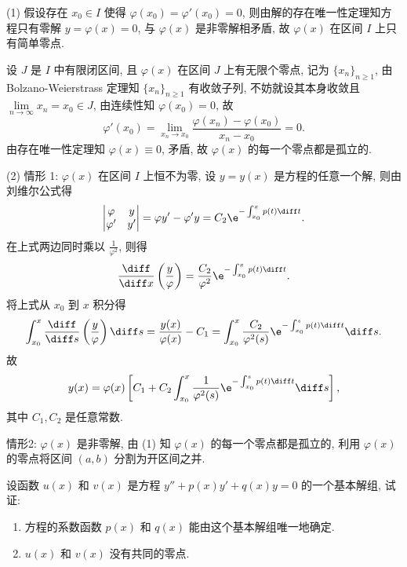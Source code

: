 \begin{solve}
  (1) 假设存在 $x_0\in I$ 使得 $\varphi(x_0)=\varphi'(x_0)=0$, 
  则由解的存在唯一性定理知方程只有零解 $y=\varphi(x)=0$, 与 $\varphi(x)$ 是非零解相矛盾, 
  故 $\varphi(x)$ 在区间 $I$ 上只有简单零点.

  设 $J$ 是 $I$ 中有限闭区间, 且 $\varphi(x)$ 在区间 $J$ 上有无限个零点, 记为 $\{x_n\}_{n\geq 1}$, 
  由 Bolzano-Weierstrass 定理知 $\{x_n\}_{n\geq 1}$ 有收敛子列,
  不妨就设其本身收敛且 $\lim\limits_{n\to\infty}x_n=x_0\in J$, 由连续性知 $\varphi(x_0)=0$, 故
  \[\varphi'(x_0)=\lim_{x_n\to x_0}\frac{\varphi(x_n)-\varphi(x_0)}{x_n-x_0}=0.\]
  由存在唯一性定理知 $\varphi(x)\equiv 0$, 矛盾, 故 $\varphi(x)$ 的每一个零点都是孤立的.

  (2) 情形 1: $\varphi(x)$ 在区间 $I$ 上恒不为零, 设 $y=y(x)$ 是方程的任意一个解, 则由刘维尔公式得
  \[\begin{vmatrix}\varphi&y\\\varphi'&y'\end{vmatrix}
    = \varphi y'-\varphi'y=C_2\e^{-\int_{x_0}^xp(t)\diff t}.\]
  在上式两边同时乘以 $\frac{1}{\varphi^2}$, 则得
  \[\frac{\diff}{\diff x}\left(\frac{y}{\varphi}\right)
    = \frac{C_2}{\varphi^2}\e^{-\int_{x_0}^xp(t)\diff t}.\]
  将上式从 $x_0$ 到 $x$ 积分得
  \[\int_{x_0}^x\frac{\diff}{\diff s}\left(\frac{y}{\varphi}\right)\diff s
    = \frac{y(x)}{\varphi(x)}-C_1
    = \int_{x_0}^x\frac{C_2}{\varphi^2(s)}\e^{-\int_{x_0}^sp(t)\diff t}\diff s.\]
  故
  \[y(x) = \varphi(x)\left[C_1+C_2\int_{x_0}^x\frac{1}{\varphi^2(s)}\e^{-\int_{x_0}^sp(t)\diff t}\diff s\right],\]
  其中 $C_1,C_2$ 是任意常数.

  情形2: $\varphi(x)$ 是非零解, 由 (1) 知 $\varphi(x)$ 的每一个零点都是孤立的, 
  利用 $\varphi(x)$ 的零点将区间 $(a,b)$ 分割为开区间之并.
\end{solve}



\begin{exercise}
  设函数 $u(x)$ 和 $v(x)$ 是方程 $y''+p(x)y'+q(x)y=0$ 的一个基本解组, 试证:
  \begin{enumerate}[(1)]
  \item 方程的系数函数 $p(x)$ 和 $q(x)$ 能由这个基本解组唯一地确定.
  \item $u(x)$ 和 $v(x)$ 没有共同的零点.
  \end{enumerate}
\end{exercise}


